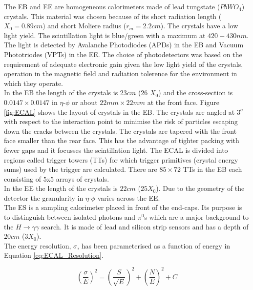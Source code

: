 The EB and EE are homogeneous calorimeters made of lead tungstate ($PbWO_{4}$)
crystals. This material was chosen because of its short radiation length ($X_{0}
= 0.89\unit{cm}$) and short Moliere radius ($r_{m} = 2.2\unit{cm}$). The 
crystals have a low light yield. The scintillation light is blue/green with a 
maximum at $420-430\unit{nm}$. The light is detected by Avalanche Photodiodes 
(APDs) in the EB and Vacuum Phototriodes (VPTs) in the EE. The choice of 
photodetectors was based on the requirement of adequate electronic gain given 
the low light yield of the crystals, operation in the magnetic field and 
radiation tolerence for the environment in which they operate. \\

In the EB the length of the crystals is $23\unit{cm}$ (26 $X_{0}$) and the 
cross-section is $0.0147\times0.0147$ in $\eta$-$\phi$ or about 
$22\unit{mm}\times22\unit{mm}$ at the front face. Figure \ref{fig:ECAL} shows 
the layout of crystals in the EB. The crystals are angled at $3^{o}$ with 
respect to the interaction point to minimise the risk of particles escaping 
down the cracks between the crystals. The crystals are tapered with the front 
face smaller than the rear face. This has the advantage of tighter packing with
fewer gaps and it focusses the scintillation light. The ECAL is divided into 
regions called trigger towers (TTs) for which trigger primitives (crystal energy 
sums) used by the trigger are calculated. There are $85\times72$ TTs in the EB 
each consisting of 5x5 arrays of crystals. \\

In the EE the length of the crystals is $22\unit{cm}$ ($25X_{0}$). Due to the 
geometry of the detector the granularity in $\eta$-$\phi$ varies across the EE. 
\\

The ES is a sampling calorimeter placed in front of the end-caps. Its purpose is
to distinguish between isolated photons and $\pi^{0}$s which are a major
background to the $H\rightarrow \gamma\gamma$ search. It is made of lead and
silicon strip sensors and has a depth of $20\unit{cm}$ ($3X_{0}$). \\

The energy resolution, $\sigma$, has been parameterised as a function of energy 
in Equation \ref{eq:ECAL_Resolution}. 

\begin{equation}
\left( \frac{\sigma}{E} \right)^{2} = \left( \frac{S}{\sqrt{E}} \right)^{2} +
\left( \frac{N}{E} \right)^{2} + C
\label{eq:ECAL_Resolution}
\end{equation}


